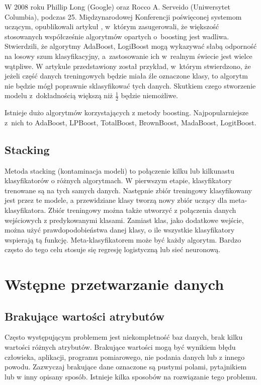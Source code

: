 W 2008 roku Phillip Long (Google) oraz Rocco A. Serveido (Uniwersytet Columbia), podczas 25. Międzynarodowej Konferencji poświęconej systemom uczącym, opublikowali artykuł \cite{boosting}, w którym zasugerowali, że większość stosowanych współcześnie algorytmów opartych o boosting jest wadliwa. Stwierdzili, że algorytmy AdaBoost, LogiBoost mogą wykazywać słabą odporność na losowy szum klasyfikacyjny, a zastosowanie ich w realnym świecie jest wielce wątpliwe. W artykule przedstawiony został przykład, w którym stwierdzono, że jeżeli część danych treningowych będzie miała źle oznaczone klasy, to algorytm nie będzie mógł poprawnie sklasyfikować tych danych. Skutkiem czego stworzenie modelu z dokładnością większą niż $\frac{1}{2}$ będzie niemożliwe. \par
Istnieje dużo algorytmów korzystających z metody boosting. Najpopularniejsze z nich to AdaBoost, LPBoost, TotalBoost, BrownBoost, MadaBoost, LogitBoost.
\subsection{Stacking}
Metoda stacking (kontaminacja modeli) \cite{stackingc} to połączenie kilku lub kilkunastu klasyfikatorów o różnych algorytmach. W pierwszym etapie, klasyfikatory trenowane są na tych samych danych. Następnie zbiór treningowy klasyfikowany jest przez te modele, a przewidziane klasy tworzą nowy zbiór uczący dla meta-klasyfikatora. Zbiór treningowy można także utworzyć z połączenia danych wejściowych z predykowanymi klasami. Zamiast klas, jako dodatkowe wejście, można użyć prawdopodobieństwa danej klasy, o ile wszystkie klasyfikatory wspierają tą funkcję. Meta-klasyfikatorem może być każdy algorytm. Bardzo często do tego celu stosuje się regresję logistyczną lub sieć neuronową. 
\section{Wstępne przetwarzanie danych}
\subsection{Brakujące wartości atrybutów}
Często występującym problemem jest niekompletność baz danych, brak kilku wartości różnych atrybutów. Brakujące wartości mogą być wynikiem błędu człowieka, aplikacji, programu pomiarowego, nie podania danych lub z innego powodu. Zazwyczaj brakujące dane oznaczone są pustymi polami, pytajnikiem lub w inny opisany sposób. Istnieje kilka sposobów na rozwiązanie tego problemu.
